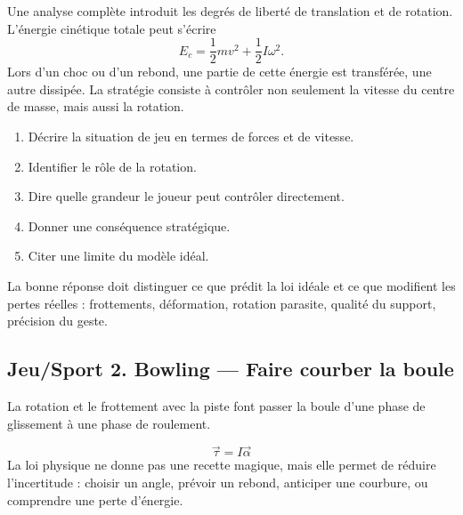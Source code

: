 \documentclass[11pt,a4paper]{article}
\begin{document}
\begin{approfondissementbox}
Une analyse complète introduit les degrés de liberté de translation et de rotation. L'énergie cinétique totale peut s'écrire
\[
E_c=\frac12mv^2+\frac12I\omega^2.
\]
Lors d'un choc ou d'un rebond, une partie de cette énergie est transférée, une autre dissipée. La stratégie consiste à contrôler non seulement la vitesse du centre de masse, mais aussi la rotation.
\end{approfondissementbox}

\begin{exercicebox}
\begin{enumerate}
  \item Décrire la situation de jeu en termes de forces et de vitesse.
  \item Identifier le rôle de la rotation.
  \item Dire quelle grandeur le joueur peut contrôler directement.
  \item Donner une conséquence stratégique.
  \item Citer une limite du modèle idéal.
\end{enumerate}
\end{exercicebox}

\begin{corrigebox}[Indication]
La bonne réponse doit distinguer ce que prédit la loi idéale et ce que modifient les pertes réelles : frottements, déformation, rotation parasite, qualité du support, précision du geste.
\end{corrigebox}


\subsection{Jeu/Sport 2. Bowling — Faire courber la boule}

\begin{exemplebox}[Observation]
La rotation et le frottement avec la piste font passer la boule d'une phase de glissement à une phase de roulement.
\end{exemplebox}

\begin{theorembox}
\[
\vec\tau=I\vec\alpha
\]
La loi physique ne donne pas une recette magique, mais elle permet de réduire l'incertitude : choisir un angle, prévoir un rebond, anticiper une courbure, ou comprendre une perte d'énergie.
\end{theorembox}
\end{document}
